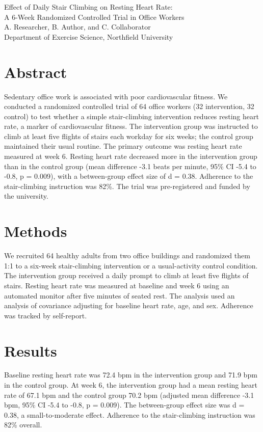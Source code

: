 \documentclass[11pt]{article}
\begin{document}
\begin{center}
{\LARGE Effect of Daily Stair Climbing on Resting Heart Rate:\\ A 6-Week Randomized Controlled Trial in Office Workers}\\[6pt]
{\large A. Researcher, B. Author, and C. Collaborator}\\[4pt]
{\small Department of Exercise Science, Northfield University}
\end{center}

\section*{Abstract}

Sedentary office work is associated with poor cardiovascular fitness. We conducted a randomized controlled trial of 64 office workers (32 intervention, 32 control) to test whether a simple stair-climbing intervention reduces resting heart rate, a marker of cardiovascular fitness. The intervention group was instructed to climb at least five flights of stairs each workday for six weeks; the control group maintained their usual routine. The primary outcome was resting heart rate measured at week 6. Resting heart rate decreased more in the intervention group than in the control group (mean difference -3.1 beats per minute, 95\% CI -5.4 to -0.8, p = 0.009), with a between-group effect size of d = 0.38. Adherence to the stair-climbing instruction was 82\%. The trial was pre-registered and funded by the university.

\section*{Methods}

We recruited 64 healthy adults from two office buildings and randomized them 1:1 to a six-week stair-climbing intervention or a usual-activity control condition. The intervention group received a daily prompt to climb at least five flights of stairs. Resting heart rate was measured at baseline and week 6 using an automated monitor after five minutes of seated rest. The analysis used an analysis of covariance adjusting for baseline heart rate, age, and sex. Adherence was tracked by self-report.

\section*{Results}

Baseline resting heart rate was 72.4 bpm in the intervention group and 71.9 bpm in the control group. At week 6, the intervention group had a mean resting heart rate of 67.1 bpm and the control group 70.2 bpm (adjusted mean difference -3.1 bpm, 95\% CI -5.4 to -0.8, p = 0.009). The between-group effect size was d = 0.38, a small-to-moderate effect. Adherence to the stair-climbing instruction was 82\% overall.
\end{document}
